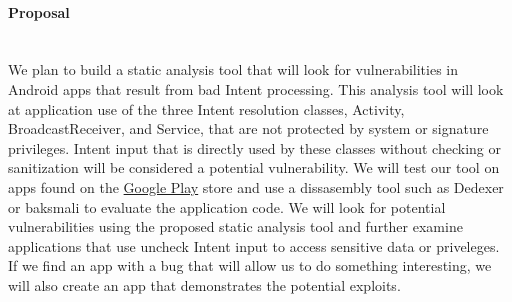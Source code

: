 \documentclass[12pt,a4paper,draft]{article}
\begin{document}
\paragraph{Proposal} ~\\
We plan to build a static analysis tool that will look for vulnerabilities in Android apps that result from bad Intent processing. This analysis tool will look at application use of the three Intent resolution classes, Activity, BroadcastReceiver, and Service, that are not protected by system or signature privileges. Intent input that is directly used by these classes without checking or sanitization will be considered a potential vulnerability. We will test our tool on apps found on the \href{https://play.google.com/store/apps}{Google Play} store and use a dissasembly tool such as Dedexer\cite{dedexer} or baksmali\cite{baksmali} to evaluate the application code. We will look for potential vulnerabilities using the proposed static analysis tool and further examine applications that use uncheck Intent input to access sensitive data or priveleges. If we find an app with a bug that will allow us to do something interesting, we will also create an app that demonstrates the potential exploits.


\end{document}
